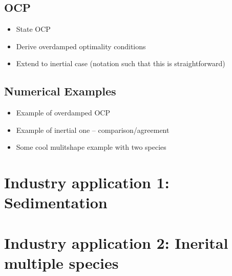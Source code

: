 \documentclass[11pt, a4paper]{article}
\theoremstyle{definition}
\begin{document}
	\subsection{OCP}
	\begin{itemize}
		\item State OCP
		\item Derive overdamped optimality conditions
		\item Extend to inertial case (notation such that this is straightforward)
	\end{itemize}
	\subsection{Numerical Examples}
	\begin{itemize}
		\item Example of overdamped OCP
		\item Example of inertial one -- comparison/agreement
		\item Some cool mulitshape example with two species
	\end{itemize}


	\section{Industry application 1: Sedimentation}
	\section{Industry application 2: Inerital multiple species}
	\pagebreak	
	
	
	
	
\end{document}
